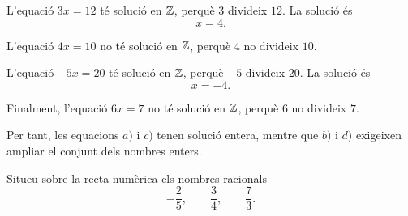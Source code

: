 \begin{solucio}
	L'equació \(3x=12\) té solució en \(\mathbb{Z}\), perquè \(3\) divideix \(12\). La solució és
	\[
	x=4.
	\]
	
	L'equació \(4x=10\) no té solució en \(\mathbb{Z}\), perquè \(4\) no divideix \(10\).
	
	L'equació \(-5x=20\) té solució en \(\mathbb{Z}\), perquè \(-5\) divideix \(20\). La solució és
	\[
	x=-4.
	\]
	
	Finalment, l'equació \(6x=7\) no té solució en \(\mathbb{Z}\), perquè \(6\) no divideix \(7\).
	
	Per tant, les equacions \(a)\) i \(c)\) tenen solució entera, mentre que \(b)\) i \(d)\) exigeixen ampliar el conjunt dels nombres enters.
\end{solucio}

\begin{exemple}
	Situeu sobre la recta numèrica els nombres racionals
	\[
	-\frac{2}{5},
	\qquad
	\frac{3}{4},
	\qquad
	\frac{7}{3}.
	\]
\end{exemple}

